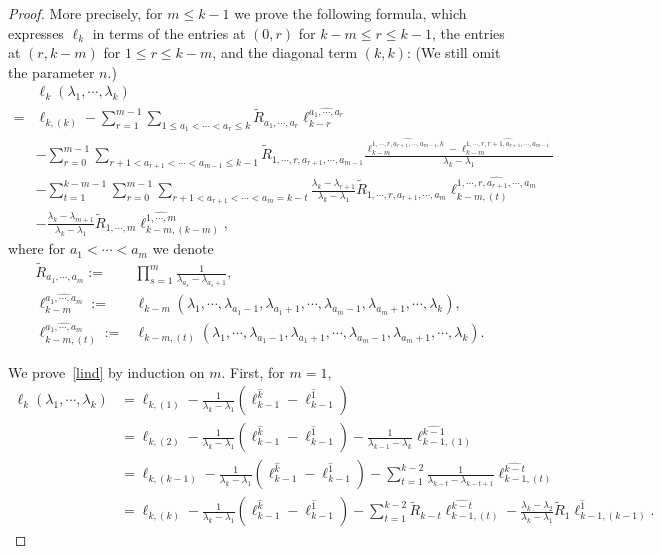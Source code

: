 \documentclass[10pt,a4paper]{amsart}
\newcommand{\nn}{\nonumber}
\begin{document}
\begin{proof}
	More precisely, for $m\le k-1$ we prove the following formula, which expresses $\ell_k$ in terms of the entries at $(0,r)$ for $k-m\le r\le k-1$, the entries at $(r,k-m)$ for $1\le r\le k-m$, and the diagonal term $(k,k)$: (We still omit the parameter $n$.)
	\begin{align}
		&\ell_k(\lambda_1,\cdots,\lambda_k)\nn \\
		=& \ell_{k,(k)}-\sum_{r=1}^{m-1}\sum_{1\le a_1<\cdots<a_r\le k}\widetilde R_{a_1,\cdots,a_r}\ell_{k-r}^{\widehat{a_1,\cdots,a_r}} \nn\\
		& -\sum_{r=0}^{m-1}\sum_{r+1<a_{r+1}<\cdots<a_{m-1}\le k-1}\widetilde R_{1,\cdots,r,a_{r+1},\cdots,a_{m-1}}\frac{\ell_{k-m}^{\widehat{1,\cdots,r,a_{r+1},\cdots,a_{m-1},k}}-\ell_{k-m}^{\widehat{1,\cdots,r,r+1,a_{r+1},\cdots,a_{m-1}}}}{\lambda_k-\lambda_1} \nn\\
		& -\sum_{t=1}^{k-m-1}\sum_{r=0}^{m-1}\sum_{r+1<a_{r+1}<\cdots<a_m=k-t} \frac{\lambda_k-\lambda_{r+1}}{\lambda_k-\lambda_1}\widetilde R_{1,\cdots,r,a_{r+1},\cdots,a_m}\ell_{k-m,(t)}^{\widehat{1,\cdots,r,a_{r+1},\cdots,a_m}}\nn\\
		&-\frac{\lambda_k-\lambda_{m+1}}{\lambda_k-\lambda_1}\widetilde R_{1,\cdots,m}\ell_{k-m,(k-m)}^{\widehat{1,\cdots,m}}, \label{lind}
	\end{align}
	where for $a_{1}<\cdots<a_{m}$ we denote
	\begin{align}
		\widetilde R_{a_1,\cdots,a_m}:=& \prod_{s=1}^{m}\frac{1}{\lambda_{a_s}-\lambda_{a_s+1}}, \\
		\ell_{k-m}^{\widehat{a_1,\cdots,a_m}} :=& \ell_{k-m}(\lambda_1,\cdots,\lambda_{a_1-1},\lambda_{a_1+1},\cdots,\lambda_{a_m-1},\lambda_{a_m+1},\cdots,\lambda_k), \\
		\ell_{k-m,(t)}^{\widehat{a_1,\cdots,a_m}} :=& \ell_{k-m,(t)}(\lambda_1,\cdots,\lambda_{a_1-1},\lambda_{a_1+1},\cdots,\lambda_{a_m-1},\lambda_{a_m+1},\cdots,\lambda_k).
	\end{align}
	
	We prove~\eqref{lind} by induction on $m$. First, for $m=1$,
	\begin{align}
		\ell_{k}(\lambda_1,\cdots,\lambda_k) &= \ell_{k,(1)}-\frac{1}{\lambda_k-\lambda_1}(\ell_{k-1}^{\widehat k}-\ell_{k-1}^{\widehat1}) \nn\\
		&= \ell_{k,(2)}-\frac{1}{\lambda_k-\lambda_1}(\ell_{k-1}^{\widehat k}-\ell_{k-1}^{\widehat1})-\frac{1}{\lambda_{k-1}-\lambda_k}\ell_{k-1,(1)}^{\widehat{k-1}} \nn\\
		&= \ell_{k,(k-1)}-\frac{1}{\lambda_k-\lambda_1}(\ell_{k-1}^{\widehat k}-\ell_{k-1}^{\widehat1})-\sum_{t=1}^{k-2}\frac{1}{\lambda_{k-t}-\lambda_{k-t+1}}\ell_{k-1,(t)}^{\widehat{k-t}} \nn\\
		&= \ell_{k,(k)}-\frac{1}{\lambda_k-\lambda_1}(\ell_{k-1}^{\widehat k}-\ell_{k-1}^{\widehat1})-\sum_{t=1}^{k-2}\widetilde R_{k-t}\ell_{k-1,(t)}^{\widehat{k-t}} -\frac{\lambda_k-\lambda_2}{\lambda_k-\lambda_1}\widetilde R_1\ell_{k-1,(k-1)}^{\widehat1}.
	\end{align}
	

\end{proof}
\end{document}
